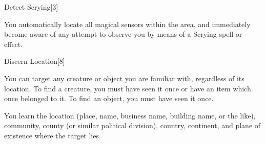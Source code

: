 \begin{spellsection}{Detect Scrying}[3]
    \begin{spellheader}
    \end{spellheader}
    \begin{spellcontent}
        \begin{spelltargetinginfo}
        \end{spelltargetinginfo}
        \begin{spelleffects}
            \spelleffect You automatically locate all magical sensors within the area, and immediately become aware of any attempt to observe you by means of a Scrying spell or effect.
            \spelldur \durext
        \end{spelleffects}
    \end{spellcontent}
    \begin{spellfooter}
    \end{spellfooter}
    \begin{spellaugments}
    \end{spellaugments}
\end{spellsection}

\begin{spellsection}{Discern Location}[8]
    \begin{spellheader}
    \end{spellheader}
    \begin{spellcontent}
        \begin{spelltargetinginfo}
            \spellspecial You can target any creature or object you are familiar with, regardless of its location. To find a creature, you must have seen it once or have an item which once belonged to it. To find an object, you must have seen it once.
        \end{spelltargetinginfo}
        \begin{spelleffects}
            \spelleffect You learn the location (place, name, business name, building name, or the like), community, county (or similar political division), country, continent, and plane of existence where the target lies.
        \end{spelleffects}
    \end{spellcontent}
    \begin{spellfooter}
    \end{spellfooter}
\end{spellsection}

